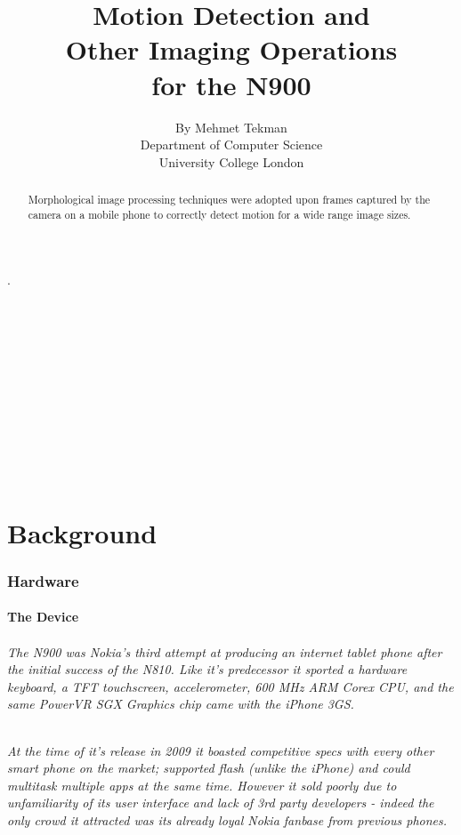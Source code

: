 \documentclass[11pt]{article} %
\title{\Huge Motion Detection and\\Other Imaging Operations\\ for the N900 }
\author{\small By Mehmet Tekman\\\small Department of Computer Science\\\small University College London}
\begin{document}
\maketitle 

\part*{}{\tiny .\\\\\\\\\\\\\\\\\\\\\\\\}

\begin{abstract}
 Morphological image processing techniques were adopted upon frames captured by the camera on a mobile phone to correctly detect motion for a wide range image sizes.
\end{abstract}

\pagebreak
\tableofcontents
\pagebreak


\part{Background}
\section{Hardware}

\subsection{The Device}
\paragraph{The N900 was Nokia's third attempt at producing an internet tablet phone after the initial success of the N810. Like it's predecessor it sported a hardware keyboard, a TFT touchscreen, accelerometer, 600 MHz ARM Corex CPU, and the same PowerVR SGX Graphics chip came with the iPhone 3GS.}
\paragraph{At the time of it's release in 2009 it boasted competitive specs with every other smart phone on the market; supported flash (unlike the iPhone) and could multitask multiple apps at the same time. However it sold poorly due to unfamiliarity of its user interface and lack of 3rd party developers - indeed the only crowd it attracted was its already loyal Nokia fanbase from previous phones.}
\end{document}

